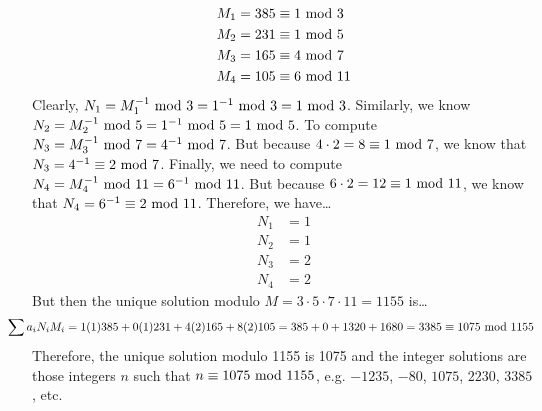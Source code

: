 \documentclass[12pt,letterpaper]{exam}
\begin{document}
\begin{questions}
{	\[
	\begin{aligned}
	M_1&= 385 \equiv 1 \text{ mod } 3 \\
	M_2&= 231 \equiv 1 \text{ mod } 5 \\
	M_3&= 165 \equiv 4 \text{ mod } 7 \\
	M_4&= 105 \equiv 6 \text{ mod } 11
	\end{aligned}
	\]
Clearly, $N_1= M_1^{-1} \text{ mod } 3= 1^{-1} \text{ mod } 3= 1 \text{ mod } 3$. Similarly, we know $N_2= M_2^{-1} \text{ mod } 5= 1^{-1} \text{ mod } 5= 1 \text{ mod } 5$. To compute $N_3= M_3^{-1} \text{ mod } 7= 4^{-1} \text{ mod } 7$. But because $4 \cdot 2= 8 \equiv 1 \text{ mod } 7$, we know that $N_3= 4^{-1} \equiv 2 \text{ mod } 7$. Finally, we need to compute $N_4= M_4^{-1} \text{ mod } 11= 6^{-1} \text{ mod } 11$. But because $6 \cdot 2= 12 \equiv 1 \text{ mod } 11$, we know that $N_4= 6^{-1} \equiv 2 \text{ mod } 11$. Therefore, we have\dots
	\[
	\begin{aligned}
	N_1&= 1 \\
	N_2&= 1 \\
	N_3&= 2 \\
	N_4&= 2
	\end{aligned}
	\]
But then the unique solution modulo $M= 3 \cdot 5 \cdot 7 \cdot 11= 1155$ is\dots
	\[
	\hspace{-0.75cm} \sum a_i N_i M_i= 1(1)385 + 0(1)231 + 4(2)165 + 8(2)105= 385 + 0 + 1320 + 1680= 3385 \equiv 1075 \mmod 1155
	\]
Therefore, the unique solution modulo 1155 is 1075 and the integer solutions are those integers $n$ such that $n \equiv 1075 \text{ mod } 1155$, e.g. $-1235$, $-80$, $1075$, $2230$, $3385$, etc. 
}


\end{questions}
\end{document}
